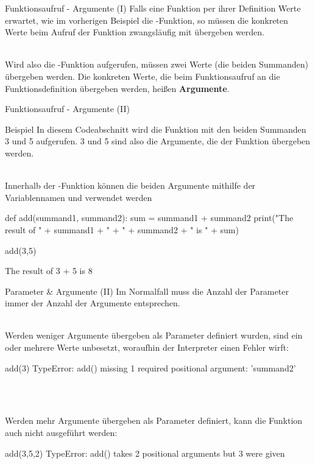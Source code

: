     \begin{frame}{Funktionsaufruf - Argumente (I)}
        Falls eine Funktion per ihrer Definition Werte erwartet, wie im vorherigen Beispiel die -Funktion, so müssen die konkreten Werte beim Aufruf der Funktion zwangsläufig mit übergeben werden. \\~\
        
        Wird also die -Funktion aufgerufen, müssen zwei Werte (die beiden Summanden) übergeben werden. Die konkreten Werte, die beim Funktionsaufruf an die Funktionsdefinition übergeben werden, heißen \textbf{Argumente}.
    \end{frame}
    
        \begin{frame}[fragile]{Funktionsaufruf - Argumente (II)}
        \begin{exampleblock}{Beispiel}
            In diesem Codeabschnitt wird die Funktion  mit den beiden Summanden 3 und 5 aufgerufen. 3 und 5 sind also die Argumente, die der  Funktion übergeben werden. \\~\
            
            Innerhalb der -Funktion können die beiden Argumente mithilfe der Variablennamen  und  verwendet werden
            
\begin{pythoncode}
def add(summand1, summand2):
    sum = summand1 + summand2
    print("The result of " + summand1 + " + " + summand2 + " is " + sum)
    

add(3,5)
\end{pythoncode}

\begin{pythoncode}
The result of 3 + 5 is 8
\end{pythoncode}
        \end{exampleblock}
    \end{frame}
    
    
    \begin{frame}[fragile]{Parameter \& Argumente (II)}
        Im Normalfall muss die Anzahl der Parameter immer der Anzahl der Argumente entsprechen. \\~\
        
        Werden weniger Argumente übergeben als Parameter definiert wurden, sind ein oder mehrere Werte unbesetzt, woraufhin der Interpreter einen Fehler wirft:
\begin{pythoncode}
add(3)
TypeError: add() missing 1 required positional argument: 'summand2'
\end{pythoncode} \\~\

       Werden mehr Argumente übergeben als Parameter definiert, kann die Funktion auch nicht ausgeführt werden:
       
\begin{pythoncode}
add(3,5,2)
TypeError: add() takes 2 positional arguments but 3 were given
\end{pythoncode}
    \end{frame}
    
